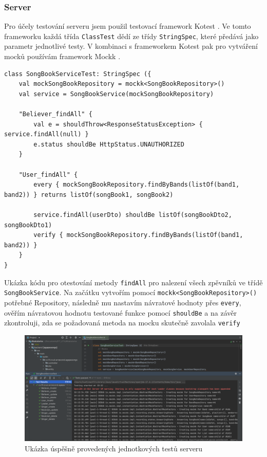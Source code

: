 \subsubsection{Server}

Pro účely testování serveru jsem použil testovací framework Kotest \cite{kotest}. Ve tomto frameworku každá třída \texttt{ClassTest} dědí ze třídy \texttt{StringSpec}, které předává jako parametr jednotlivé testy. V kombinaci s frameworkem Kotest pak pro vytváření mocků používám framework Mockk \cite{mockk}.

\begin{listing}[H]
\begin{verbatim}
class SongBookServiceTest: StringSpec ({
    val mockSongBookRepository = mockk<SongBookRepository>()
    val service = SongBookService(mockSongBookRepository)

    "Believer_findAll" {
        val e = shouldThrow<ResponseStatusException> { service.findAll(null) }
        e.status shouldBe HttpStatus.UNAUTHORIZED
    }
    
    "User_findAll" {
        every { mockSongBookRepository.findByBands(listOf(band1, band2)) } returns listOf(songBook1, songBook2)

        service.findAll(userDto) shouldBe listOf(songBookDto2, songBookDto1)
        verify { mockSongBookRepository.findByBands(listOf(band1, band2)) }
    }
}
\end{verbatim}
\caption[Ukázka kódu pro otestování Service pro zpěvníky na serveru]{Ukázka kódu pro otestování metody \texttt{findAll} pro nalezení všech zpěvníků ve třídě \texttt{SongBookService}. Na začátku vytvořím pomocí \texttt{mockk<SongBookRepository>()} potřebné Repository, následně mu nastavím návratové hodnoty přes \texttt{every}, ověřím návratovou hodnotu testované funkce pomocí \texttt{shouldBe} a na závěr zkontroluji, zda se požadovaná metoda na mocku skutečně zavolala \texttt{verify}}
\end{listing}

\begin{figure}[H]
    \includegraphics[width=\textwidth]{images/6-testovani/6-1-unit-test-server.png}
    \caption{Ukázka úspěšně provedených jednotkových testů serveru}
\end{figure}

